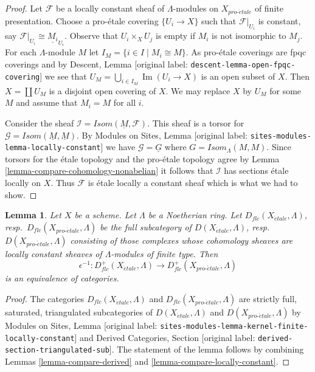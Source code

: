 \documentclass[10pt,a4paper]{article}
\theoremstyle{plain}
\newtheorem{lemma}[subsection]{Lemma}
\theoremstyle{definition}
\theoremstyle{remark}
\numberwithin{equation}{subsection}
\def\proetale{{pro\text{-}\acute{e}tale}}
\def\etale{{\acute{e}tale}}
\def\Im{\mathop{\mathrm{Im}}}
\begin{document}
\begin{proof}
Let $\mathcal{F}$ be a locally constant sheaf of $\Lambda$-modules
on $X_\proetale$ of finite presentation. Choose a pro-\'etale covering
$\{U_i \to X\}$ such that $\mathcal{F}|_{U_i}$ is constant, say
$\mathcal{F}|_{U_i} \cong \underline{M_i}_{U_i}$.
Observe that $U_i \times_X U_j$ is empty if $M_i$ is not isomorphic
to $M_j$.
For each $\Lambda$-module $M$ let $I_M = \{i \in I \mid M_i \cong M\}$.
As pro-\'etale coverings are fpqc coverings and by
Descent, Lemma \textnormal{[original label: \nolinkurl{descent-lemma-open-fpqc-covering}]}
we see that $U_M = \bigcup_{i \in I_M} \Im(U_i \to X)$
is an open subset of $X$. Then $X = \coprod U_M$ is a disjoint
open covering of $X$. We may replace $X$ by $U_M$ for some $M$ and
assume that $M_i = M$ for all $i$.

\medskip\noindent
Consider the sheaf $\mathcal{I} = \mathit{Isom}(\underline{M}, \mathcal{F})$.
This sheaf is a torsor for
$\mathcal{G} = \mathit{Isom}(\underline{M}, \underline{M})$.
By Modules on Sites, Lemma \textnormal{[original label: \nolinkurl{sites-modules-lemma-locally-constant}]}
we have $\mathcal{G} = \underline{G}$
where $G = \mathit{Isom}_\Lambda(M, M)$.
Since torsors for the \'etale topology
and the pro-\'etale topology agree by
Lemma \ref{lemma-compare-cohomology-nonabelian}
it follows that $\mathcal{I}$ has sections \'etale locally on $X$.
Thus $\mathcal{F}$ is \'etale locally a constant sheaf which is
what we had to show.
\end{proof}

\begin{lemma}
\label{lemma-compare-locally-constant-derived}
Let $X$ be a scheme. Let $\Lambda$ be a Noetherian ring.
Let $D_{flc}(X_\etale, \Lambda)$, resp.\ $D_{flc}(X_\proetale, \Lambda)$
be the full subcategory of
$D(X_\etale, \Lambda)$, resp.\ $D(X_\proetale, \Lambda)$
consisting of those complexes whose cohomology sheaves are locally
constant sheaves of $\Lambda$-modules of finite type. Then
$$
\epsilon^{-1} :
D_{flc}^+(X_\etale, \Lambda)
\longrightarrow
D_{flc}^+(X_\proetale, \Lambda)
$$
is an equivalence of categories.
\end{lemma}

\begin{proof}
The categories $D_{flc}(X_\etale, \Lambda)$ and $D_{flc}(X_\proetale, \Lambda)$
are strictly full, saturated, triangulated subcategories of
$D(X_\etale, \Lambda)$ and $D(X_\proetale, \Lambda)$
by Modules on Sites, Lemma
\textnormal{[original label: \nolinkurl{sites-modules-lemma-kernel-finite-locally-constant}]}
and
Derived Categories, Section \textnormal{[original label: \nolinkurl{derived-section-triangulated-sub}]}.
The statement of the lemma follows by combining
Lemmas \ref{lemma-compare-derived} and
\ref{lemma-compare-locally-constant}.
\end{proof}
\end{document}
